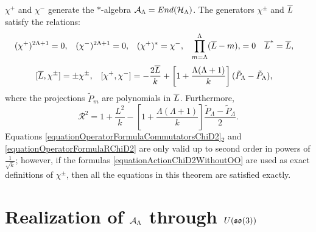 \begin{theorem}[Summary]
$\chi^+$ and $\chi^-$ generate the $*$-algebra $\mathcal A_\Lambda = End(\mathcal H_\Lambda)$. The generators $\chi^\pm$ and $\overline{L}$ satisfy  the relations:
\begin{align}\label{equationOperatorFormulaRelationsChiD2}
    (\chi^+)^{2\Lambda+1} &= 0, & 
    (\chi^-)^{2\Lambda+1} &= 0, & 
    (\chi^+)^*&= \chi^-, & 
    \prod_{m = \Lambda}^\Lambda (\overline{L} - m), &= 0 & 
    \overline{L}^* &= \overline{L},
\end{align}
\begin{align}\label{equationOperatorFormulaCommutatorsChiD2}
    [\overline{L}, \chi^\pm] &= \pm \chi^\pm,&
    [\chi^+, \chi^-] &= - \frac{2\overline{L}}{k} + \left[ 1 + \frac{\Lambda(\Lambda+1)}{k}\right](\tilde P_\Lambda - \tilde P_\Lambda),
\end{align}
where the projections $\tilde P_m$ are polynomials in $\overline{L}$. Furthermore,
\begin{equation}\label{equationOperatorFormulaRChiD2}
    \mathcal R^2 = 1 + \frac{L^2}{k} - \left[ 1 + \frac{\Lambda(\Lambda+1)}{k}\right]\frac{\tilde P_\Lambda - \tilde P_\Lambda}{2}.
\end{equation}
Equations \eqref{equationOperatorFormulaCommutatorsChiD2}$_2$ and \eqref{equationOperatorFormulaRChiD2} are only valid up to second order in powers of $\frac{1}{\sqrt{k}}$; however, if the formulas \eqref{equationActionChiD2WithoutOO} are used as exact definitions of $\chi^\pm$, then all the equations in this theorem are satisfied exactly.
\end{theorem}








\section{Realization of $\mathcal A_\Lambda$ through $U(\mathfrak{so}(3))$}

    
